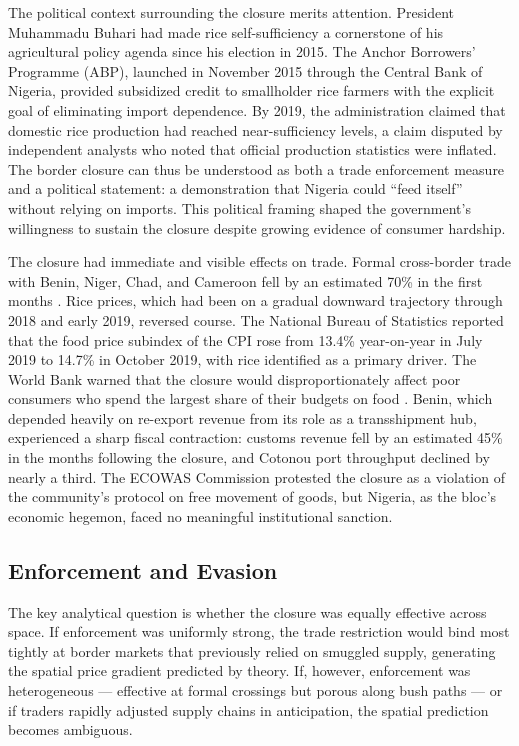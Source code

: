 \documentclass[12pt]{article}
\begin{document}
The political context surrounding the closure merits attention. President Muhammadu Buhari had made rice self-sufficiency a cornerstone of his agricultural policy agenda since his election in 2015. The Anchor Borrowers' Programme (ABP), launched in November 2015 through the Central Bank of Nigeria, provided subsidized credit to smallholder rice farmers with the explicit goal of eliminating import dependence. By 2019, the administration claimed that domestic rice production had reached near-sufficiency levels, a claim disputed by independent analysts who noted that official production statistics were inflated. The border closure can thus be understood as both a trade enforcement measure and a political statement: a demonstration that Nigeria could ``feed itself'' without relying on imports. This political framing shaped the government's willingness to sustain the closure despite growing evidence of consumer hardship.

The closure had immediate and visible effects on trade. Formal cross-border trade with Benin, Niger, Chad, and Cameroon fell by an estimated 70\% in the first months \citep{calvo2019nigeria}. Rice prices, which had been on a gradual downward trajectory through 2018 and early 2019, reversed course. The National Bureau of Statistics reported that the food price subindex of the CPI rose from 13.4\% year-on-year in July 2019 to 14.7\% in October 2019, with rice identified as a primary driver. The World Bank warned that the closure would disproportionately affect poor consumers who spend the largest share of their budgets on food \citep{calvo2019nigeria}. Benin, which depended heavily on re-export revenue from its role as a transshipment hub, experienced a sharp fiscal contraction: customs revenue fell by an estimated 45\% in the months following the closure, and Cotonou port throughput declined by nearly a third. The ECOWAS Commission protested the closure as a violation of the community's protocol on free movement of goods, but Nigeria, as the bloc's economic hegemon, faced no meaningful institutional sanction.

\subsection{Enforcement and Evasion}

The key analytical question is whether the closure was equally effective across space. If enforcement was uniformly strong, the trade restriction would bind most tightly at border markets that previously relied on smuggled supply, generating the spatial price gradient predicted by theory. If, however, enforcement was heterogeneous --- effective at formal crossings but porous along bush paths --- or if traders rapidly adjusted supply chains in anticipation, the spatial prediction becomes ambiguous.
\end{document}

